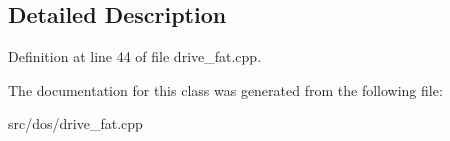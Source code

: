\subsection{Detailed Description}


Definition at line 44 of file drive\-\_\-fat.\-cpp.



The documentation for this class was generated from the following file\-:\begin{DoxyCompactItemize}
\item 
src/dos/drive\-\_\-fat.\-cpp\end{DoxyCompactItemize}
